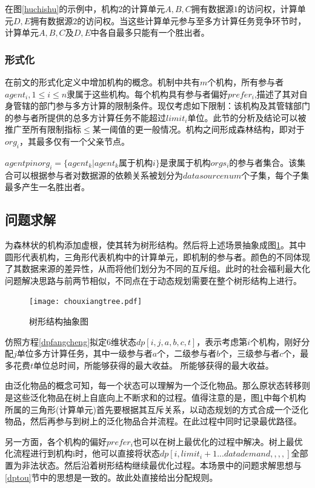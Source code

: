 \documentclass[promaster]{thesis-uestc}
\begin{document}
在图\ref{huchishu}的示例中，机构2的计算单元$A,B,C$拥有数据源$1$的访问权，计算单元$D,E$拥有数据源$2$的访问权。当这些计算单元参与至多方计算任务竞争环节时，计算单元$A,B,C$及$D,E$中各自最多只能有一个胜出者。
\subsubsection{形式化}

在前文的形式化定义中增加机构的概念。机制中共有$m$个机构，所有参与者$agent_i,1 \leq i \leq n$隶属于这些机构。每个机构具有参与者偏好$prefer_i$,描述了其对自身管辖的部门参与多方计算的限制条件。现仅考虑如下限制：该机构及其管辖部门的参与者所提供的总多方计算任务不能超过$limit_i$单位。此节的分析及结论可以被推广至所有限制指标$\leq$某一阈值的更一般情况。机构之间形成森林结构，即对于$org_i$，其最多仅有一个父亲节点。

$agentpinorg_i=\{agent_k|agent_k属于机构i\}$是隶属于机构$orgs_i$的参与者集合。该集合可以根据参与者对数据源的依赖关系被划分为$datasourcenum$个子集，每个子集最多产生一名胜出者。

\subsection{问题求解}
为森林状的机构添加虚根，使其转为树形结构。然后将上述场景抽象成图\ref{chouxiangtree}。其中圆形代表机构，三角形代表机构中的计算单元，即机制的参与者。颜色的不同体现了其数据来源的差异性，从而将他们划分为不同的互斥组。此时的社会福利最大化问题解决思路与前两节相似，不同点在于动态规划需要在整个树形结构上进行。

\begin{figure}[h]
    \texttt{[image: chouxiangtree.pdf]}
    \caption{树形结构抽象图}
    \label{chouxiangtree}
\end{figure}

仿照方程\ref{dpfangcheng}拟定6维状态$dp[i,j,a,b,c,t]$，表示考虑第$i$个机构，刚好分配$j$单位多方计算任务，其中一级参与者$a$个，二级参与者$b$个，三级参与者$c$个，最多花费$t$单位总时间，所能够获得的最大收益。
所能够获得的最大收益。

由泛化物品的概念可知，每一个状态可以理解为一个泛化物品。那么原状态转移则是这些泛化物品在树上自底向上不断求和的过程。值得注意的是，图\ref{chouxiangtree}中每个机构所属的三角形(计算单元)首先要根据其互斥关系，以动态规划的方式合成一个泛化物品，然后再参与到树上的泛化物品合并流程。在此过程中同时记录最优路径。

另一方面，各个机构的偏好$prefer_i$也可以在树上最优化的过程中解决。树上最优化流程进行到机构i时，他可以直接将状态$dp[i,limit_i+1...datademand,,,,]$全部置为非法状态。然后沿着树形结构继续最优化过程。本场景中的问题求解思想与\ref{dptou}节中的思想是一致的。故此处直接给出分配规则。
\end{document}
